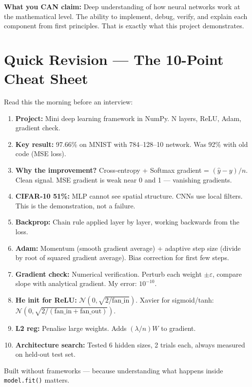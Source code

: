 \documentclass[12pt, a4paper]{article}
\begin{document}
\textbf{What you CAN claim:} Deep understanding of how neural networks work at the mathematical level. The ability to implement, debug, verify, and explain each component from first principles. That is exactly what this project demonstrates.

\section{Quick Revision --- The 10-Point Cheat Sheet}

Read this the morning before an interview:

\begin{enumerate}
  \item \textbf{Project:} Mini deep learning framework in NumPy. N layers, ReLU, Adam, gradient check.

  \item \textbf{Key result:} 97.66\% on MNIST with 784--128--10 network. Was 92\% with old code (MSE loss).

  \item \textbf{Why the improvement?} Cross-entropy + Softmax gradient = $(\hat{y} - y)/n$. Clean signal. MSE gradient is weak near 0 and 1 --- vanishing gradients.

  \item \textbf{CIFAR-10 51\%:} MLP cannot see spatial structure. CNNs use local filters. This is the demonstration, not a failure.

  \item \textbf{Backprop:} Chain rule applied layer by layer, working backwards from the loss.

  \item \textbf{Adam:} Momentum (smooth gradient average) + adaptive step size (divide by root of squared gradient average). Bias correction for first few steps.

  \item \textbf{Gradient check:} Numerical verification. Perturb each weight $\pm\varepsilon$, compare slope with analytical gradient. My error: $10^{-10}$.

  \item \textbf{He init for ReLU:} $\mathcal{N}(0, \sqrt{2/\text{fan\_in}})$. Xavier for sigmoid/tanh: $\mathcal{N}(0, \sqrt{2/(\text{fan\_in}+\text{fan\_out})})$.

  \item \textbf{L2 reg:} Penalise large weights. Adds $(\lambda/n) W$ to gradient.

  \item \textbf{Architecture search:} Tested 6 hidden sizes, 2 trials each, always measured on held-out test set.
\end{enumerate}

\vfill
\begin{center}
  \small\color{darkgray}
  Built without frameworks --- because understanding what happens inside \texttt{model.fit()} matters.
\end{center}
\end{document}
